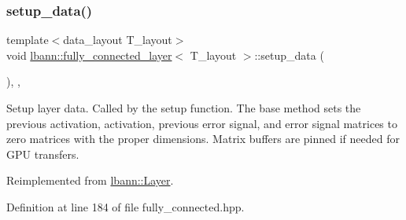 \subsubsection{\texorpdfstring{setup\+\_\+data()}{setup\_data()}}
{\footnotesize\ttfamily template$<$data\+\_\+layout T\+\_\+layout$>$ \\
void \hyperlink{classlbann_1_1fully__connected__layer}{lbann\+::fully\+\_\+connected\+\_\+layer}$<$ T\+\_\+layout $>$\+::setup\+\_\+data (\begin{DoxyParamCaption}{ }\end{DoxyParamCaption})\hspace{0.3cm}{\ttfamily [inline]}, {\ttfamily [override]}, {\ttfamily [virtual]}}

Setup layer data. Called by the setup function. The base method sets the previous activation, activation, previous error signal, and error signal matrices to zero matrices with the proper dimensions. Matrix buffers are pinned if needed for G\+PU transfers. 

Reimplemented from \hyperlink{classlbann_1_1Layer_a50a89f8a68762c677d48efe384676e81}{lbann\+::\+Layer}.



Definition at line 184 of file fully\+\_\+connected.\+hpp.


